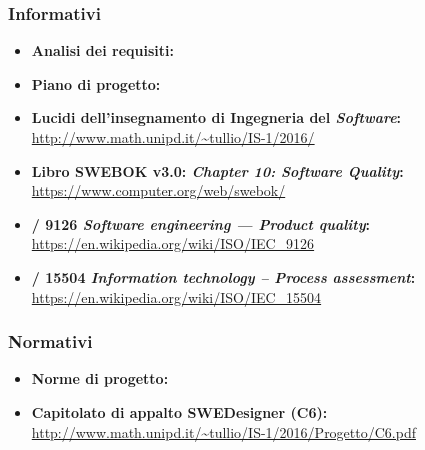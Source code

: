     \subsubsection{Informativi}
      \begin{itemize}
        \item \textbf{Analisi dei requisiti:} 
        \item \textbf{Piano di progetto:} 
        \item \textbf{Lucidi dell'insegnamento di Ingegneria del \emph{Software}:}\\
        \url{http://www.math.unipd.it/~tullio/IS-1/2016/}
        \item \textbf{Libro SWEBOK v3.0: \emph{Chapter 10: Software Quality}:}\\
        \url{https://www.computer.org/web/swebok/}
        \item \textbf{/ 9126 \emph{Software engineering — Product quality}:}\\
        \url{https://en.wikipedia.org/wiki/ISO/IEC_9126}
        \item \textbf{/ 15504 \emph{Information technology – Process assessment}:}\\
        \url{https://en.wikipedia.org/wiki/ISO/IEC_15504}
      \end{itemize}
    \subsubsection{Normativi}
      \begin{itemize}
        \item \textbf{Norme di progetto:} 
        \item \textbf{Capitolato di appalto SWEDesigner (C6):}\\
        \url{http://www.math.unipd.it/~tullio/IS-1/2016/Progetto/C6.pdf}
      \end{itemize}
